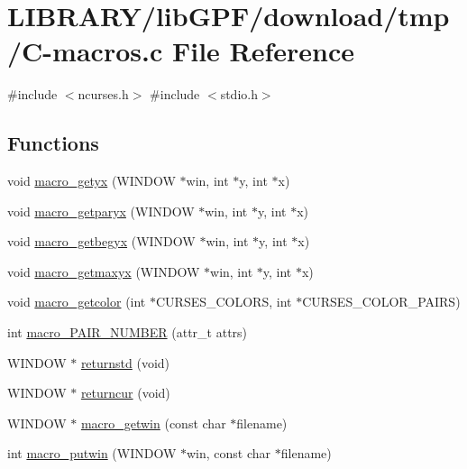 \hypertarget{C-macros_8c}{}\section{L\+I\+B\+R\+A\+R\+Y/lib\+G\+P\+F/download/tmp/\+C-\/macros.c File Reference}
\label{C-macros_8c}
{\ttfamily \#include $<$ncurses.\+h$>$}\newline
{\ttfamily \#include $<$stdio.\+h$>$}\newline
\subsection*{Functions}
\begin{DoxyCompactItemize}
\item 
void \hyperlink{C-macros_8c_aec4c991cd5e4f77a97522b629ce9a35d}{macro\+\_\+getyx} (W\+I\+N\+D\+OW $\ast$win, int $\ast$y, int $\ast$x)
\item 
void \hyperlink{C-macros_8c_a43e5c2d50865008298609d40c6d6d77f}{macro\+\_\+getparyx} (W\+I\+N\+D\+OW $\ast$win, int $\ast$y, int $\ast$x)
\item 
void \hyperlink{C-macros_8c_a8e5be14f91272f8f12e72fc95b62f388}{macro\+\_\+getbegyx} (W\+I\+N\+D\+OW $\ast$win, int $\ast$y, int $\ast$x)
\item 
void \hyperlink{C-macros_8c_a649e67968f7580eb7f457eaf81344a17}{macro\+\_\+getmaxyx} (W\+I\+N\+D\+OW $\ast$win, int $\ast$y, int $\ast$x)
\item 
void \hyperlink{C-macros_8c_a7a25008dbdb05482d687f2fba917dd6a}{macro\+\_\+getcolor} (int $\ast$C\+U\+R\+S\+E\+S\+\_\+\+C\+O\+L\+O\+RS, int $\ast$C\+U\+R\+S\+E\+S\+\_\+\+C\+O\+L\+O\+R\+\_\+\+P\+A\+I\+RS)
\item 
int \hyperlink{C-macros_8c_a1529eee133fecd25ee186b9636362642}{macro\+\_\+\+P\+A\+I\+R\+\_\+\+N\+U\+M\+B\+ER} (attr\+\_\+t attrs)
\item 
W\+I\+N\+D\+OW $\ast$ \hyperlink{C-macros_8c_a764ca4a6d51c7f4ba2572e356e2c091a}{returnstd} (void)
\item 
W\+I\+N\+D\+OW $\ast$ \hyperlink{C-macros_8c_ae1f7c686646a074ab666139875a438de}{returncur} (void)
\item 
W\+I\+N\+D\+OW $\ast$ \hyperlink{C-macros_8c_ae709af03751af4c18a67fce4f7bb9549}{macro\+\_\+getwin} (const char $\ast$filename)
\item 
int \hyperlink{C-macros_8c_ab0c3eeebd7100e8c614384e42efadcd6}{macro\+\_\+putwin} (W\+I\+N\+D\+OW $\ast$win, const char $\ast$filename)

\end{DoxyCompactItemize}
